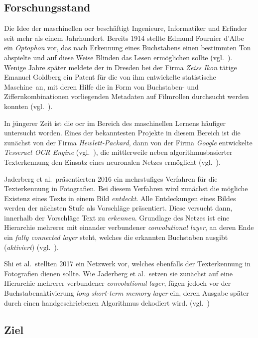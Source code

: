 \subsection{Forschungsstand}
\label{einleitung:forschung}

Die Idee der maschinellen \gls{ocr} beschäftigt Ingenieure, Informatiker und Erfinder seit mehr als einem Jahrhundert.
Bereits 1914 stellte Edmund Fournier d'Albe ein \textit{Optophon} vor, das nach Erkennung eines Buchstabens einen
bestimmten Ton abspielte und auf diese Weise Blinden das Lesen ermöglichen sollte (vgl.~\cite{albe1914}). Wenige Jahre
später meldete der in Dresden bei der Firma \textit{Zeiss Ikon} tätige Emanuel Goldberg ein Patent für die von ihm
entwickelte \glqq statistische Maschine\grqq\ an, mit deren Hilfe die in Form von Buchstaben- und Ziffernkombinationen
vorliegenden Metadaten auf Filmrollen durchsucht werden konnten (vgl.~\cite{goldberg1931}).

In jüngerer Zeit ist die \gls{ocr} im Bereich des maschinellen Lernens häufiger untersucht worden. Eines der
bekanntesten Projekte in diesem Bereich ist die zunächst von der Firma \textit{Hewlett-Packard}, dann von der Firma
\textit{Google} entwickelte \textit{Tesseract OCR Engine} (vgl.~\cite{smith2007}), die mittlerweile neben
algorithmusbasierter Texterkennung den Einsatz eines neuronalen Netzes ermöglicht (vgl.~\cite{tesseract40}).

Jaderberg et al.\ präsentierten 2016 ein mehrstufiges Verfahren für die Texterkennung in Fotografien. Bei diesem
Verfahren wird zunächst die mögliche Existenz eines Texts in einem Bild \textit{entdeckt}. Alle Entdeckungen eines
Bildes werden der nächsten Stufe als Vorschläge präsentiert. Diese versucht dann, innerhalb der Vorschläge Text zu
\textit{erkennen}. Grundlage des Netzes ist eine Hierarchie mehrerer mit einander verbundener
\textit{convolutional layer}, an deren Ende ein \textit{fully connected layer} steht, welches die erkannten Buchstaben
ausgibt (\textit{aktiviert}) (vgl.~\cite{jaderberg2016}).

Shi et al.\ stellten 2017 ein Netzwerk vor, welches ebenfalls der Texterkennung in Fotografien dienen sollte. Wie
Jaderberg et al.\ setzen sie zunächst auf eine Hierarchie mehrerer verbundener \textit{convolutional layer}, fügen
jedoch vor der Buchstabenaktivierung \textit{long short-term memory layer} ein, deren Ausgabe später durch einen
handgeschriebenen Algorithmus dekodiert wird. (vgl.~\cite{shi2017})

\subsection{Ziel}
\label{einleitung:ziel}

